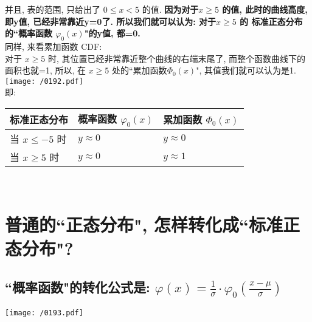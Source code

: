 \documentclass[UTF8]{ctexart}
\begin{document}
并且, 表的范围, 只给出了 $ 0 \leq x < 5$  的值. \textbf{因为对于$ x \geq 5$ 的值, 此时的曲线高度, 即y值, 已经非常靠近y=0了. 所以我们就可以认为: 对于$ x \geq 5$ 的 标准正态分布的``概率函数 $ \varphi_0(x)$"的y值, 都=0.} \\


同样, 来看累加函数 CDF: \\
对于 $ x \geq 5$ 时, 其位置已经非常靠近整个曲线的右端末尾了, 而整个函数曲线下的面积也就=1, 所以, 在 $ x \geq 5$  处的``累加函数$ \Phi_0(x)$", 其值我们就可以认为是1. \\

\texttt{[image: /0192.pdf]}  \\

即: \\
\begin{tabular}{|l|l|l|}
	\hline
	标准正态分布 & 概率函数 $\varphi _0(x)$  & 累加函数 $\Phi _0(x)$ \\
	\hline
	当 $x \leq -5$ 时 & $y \approx 0$ & $y \approx 0$\\
	\hline
	当 $x \geq 5$ 时 & $y \approx 0$ & $y \approx 1$\\
	\hline
\end{tabular} \\








\section{普通的``正态分布", 怎样转化成``标准正态分布"?}

\subsection{``概率函数"的转化公式是: $\boxed{
	\varphi (x)=\frac{1}{\sigma}\cdot \varphi _0(\frac{x-\mu}{\sigma})
	}$}

\texttt{[image: /0193.pdf]} \\
\end{document}
